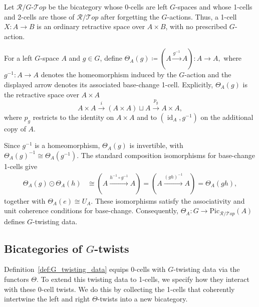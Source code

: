 \documentclass[11pt,oneside]{amsart}
\DeclareMathOperator{\id}{id}
\numberwithin{equation}{section}
\numberwithin{figure}{section}
\theoremstyle{plain}
\theoremstyle{definition}
\theoremstyle{remark}
\begin{document}
\begin{example}
\label{ex:retractive-G-twisting-data}
Let \(\mathcal R/G\text{-}\mathcal{T}op\) be the bicategory whose
0-cells are left \(G\)-spaces and whose 1-cells and 2-cells are those
of \(\mathcal R/\mathcal{T}op\) after forgetting the \(G\)-actions.
Thus, a 1-cell \(X\colon A\to B\) is an ordinary retractive space over
\(A\times B\), with no prescribed \(G\)-action.

For a left \(G\)-space \(A\) and \(g\in G\), define
\(
\Theta_A(g)
\coloneqq
(A\xrightarrow{g^{-1}}A)\colon A\to A,
\)
where \(g^{-1}\colon A\to A\) denotes the homeomorphism induced by the
\(G\)-action and the displayed arrow denotes its associated
base-change 1-cell. Explicitly, \(\Theta_A(g)\) is the retractive
space over \(A\times A\)
\[
A\times A
\xrightarrow{i}
(A\times A)\sqcup A
\xrightarrow{p_g}
A\times A,
\]
where \(p_g\) restricts to the identity on \(A\times A\) and to
\((\id_A,g^{-1})\) on the additional copy of \(A\).

Since \(g^{-1}\) is a homeomorphism, \(\Theta_A(g)\) is invertible,
with
\(
\Theta_A(g)^{-1}\cong\Theta_A(g^{-1}).
\)
The standard composition isomorphisms for base-change 1-cells give
\[
\begin{aligned}
\Theta_A(g)\odot\Theta_A(h)
&\cong
(A\xrightarrow{h^{-1}\circ g^{-1}}A)  =
(A\xrightarrow{(gh)^{-1}}A)
=
\Theta_A(gh),
\end{aligned}
\]
together with \(\Theta_A(e)\cong U_A\). These isomorphisms satisfy the
associativity and unit coherence conditions for base-change.
Consequently,
\(
\Theta_A\colon G\to\mathrm{Pic}_{\mathcal R/\mathcal{T}op}(A)
\)
defines \(G\)-twisting data.
\end{example}

\subsection{Bicategories of $G$-twists}

Definition~\ref{def:G_twisting_data} equips 0-cells with $G$-twisting data via the functors $\Theta$. To extend this twisting data to 1-cells, we specify how they interact with these 0-cell twists. We do this by collecting the 1-cells that coherently intertwine the left and right $\Theta$-twists into a new bicategory. 
\end{document}
